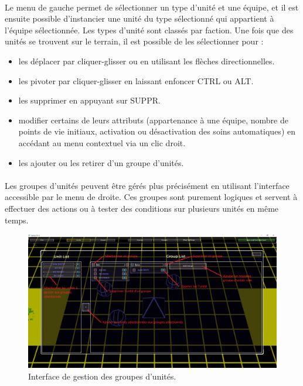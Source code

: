\documentclass[a4paper]{article}
\begin{document}
\paragraph{ }
Le menu de gauche permet de sélectionner un type d'unité et une équipe, et il est ensuite possible d'instancier une unité du type sélectionné qui appartient à l'équipe sélectionnée. Les types d'unité sont classés par faction. Une fois que des unités se trouvent sur le terrain, il est possible de les sélectionner pour :
\begin{itemize}
\item les déplacer par cliquer-glisser ou en utilisant les flèches directionnelles.
\item les pivoter par cliquer-glisser en laissant enfoncer CTRL ou ALT. 
\item les supprimer en appuyant sur SUPPR.
\item modifier certains de leurs attributs (appartenance à une équipe, nombre de points de vie initiaux, activation ou désactivation des soins automatiques) en accédant au menu contextuel via un clic droit.
\item les ajouter ou les retirer d'un groupe d'unités.
\end{itemize}
\paragraph{ }
Les groupes d'unités peuvent être gérés plus précisément en utilisant l'interface accessible par le menu de droite. Ces groupes sont purement logiques et servent à effectuer des actions ou à tester des conditions sur plusieurs unités en même temps.
\begin{figure}[H]
\centering
\includegraphics[width=\linewidth]{editor-groups.png}
\caption{Interface de gestion des groupes d'unités.}
\label{fig:editor-groups}
\end{figure}
\end{document}
